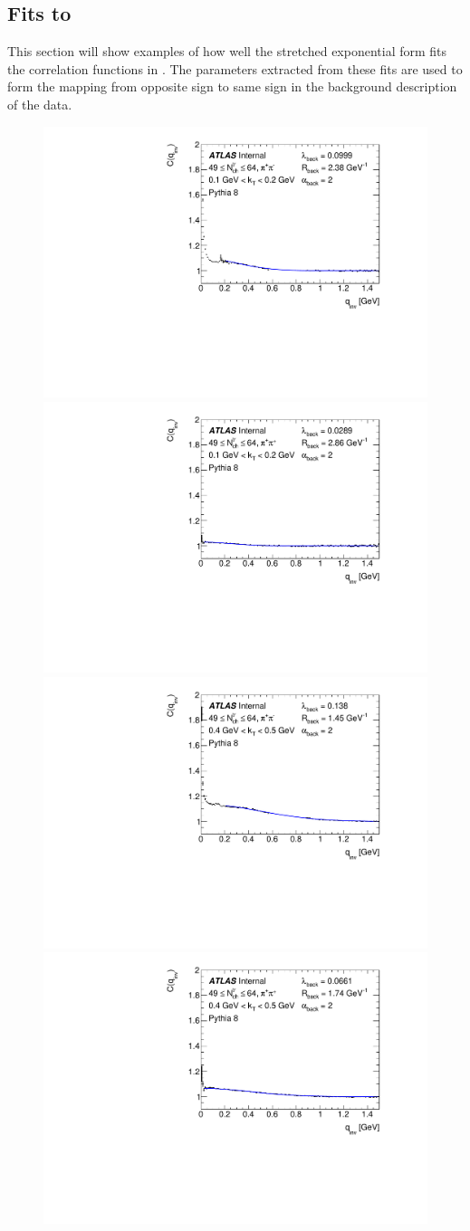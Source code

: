 \subsection{Fits to \Pythia}
\label{subsec:pythia_fits}

This section will show examples of how well the stretched exponential form fits the correlation functions in \PYEight.
The parameters extracted from these fits are used to form the mapping from opposite sign to same sign in the background description of the data.

\begin{figure}[t]
\begin{minipage}[t]{1.0\textwidth}
\centering
\includegraphics[width=.49\linewidth]{Cqinv_pythia_cent3_e0_kt0.pdf}
\includegraphics[width=.49\linewidth]{Cqinv_pythia_cent3_e1_kt0.pdf}\\
\includegraphics[width=.49\linewidth]{Cqinv_pythia_cent3_e0_kt3.pdf}
\includegraphics[width=.49\linewidth]{Cqinv_pythia_cent3_e1_kt3.pdf}\\

\end{minipage}
\end{figure}
